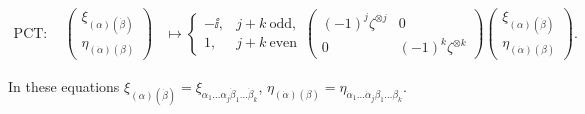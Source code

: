 \begin{equation}
\begin{aligned}
  \mathrm{PCT}:\quad
  \begin{pmatrix}
    \xi_{(\alpha)(\dot\beta)}\\
    \eta_{(\dot\alpha)(\beta)}
  \end{pmatrix}
  &\longmapsto
  \begin{cases}
    -\ii,&j+k\ \text{odd},\\
    1,&j+k\ \text{even}
  \end{cases}
  \begin{pmatrix}
    (-1)^j\zeta^{\otimes j}&0\\
    0&(-1)^k\zeta^{\otimes k}
  \end{pmatrix}
  \begin{pmatrix}
    \xi_{(\alpha)(\dot\beta)}\\
    \eta_{(\dot\alpha)(\beta)}
  \end{pmatrix} .
\end{aligned}
\tag{1-51}\label{eq:ch1-general-spinor-pct}
\end{equation}

In these equations
$\xi_{(\alpha)(\dot\beta)}=\xi_{\alpha_1\ldots\alpha_j\dot\beta_1\ldots\dot\beta_k}$,
$\eta_{(\dot\alpha)(\beta)}=\eta_{\dot\alpha_1\ldots\dot\alpha_j\beta_1\ldots\beta_k}$.


